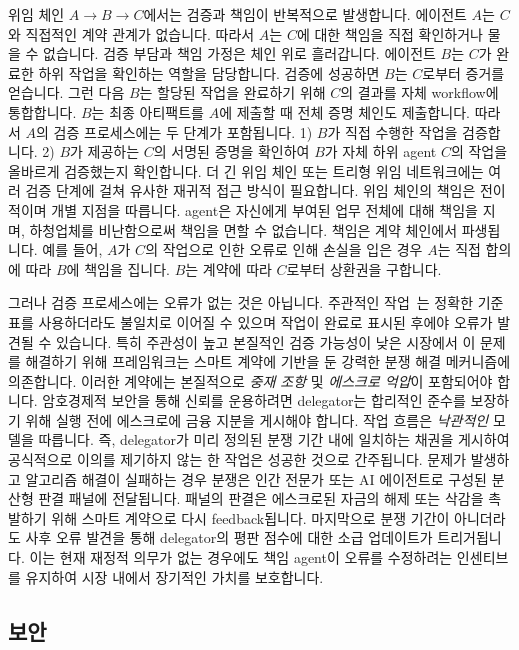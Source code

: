 \documentclass[11pt, a4paper, twocolumn, copyright, goog]{google}
\begin{document}
위임 체인 $A \rightarrow B \rightarrow C$에서는 검증과 책임이 반복적으로 발생합니다. 에이전트 $A$는 $C$와 직접적인 계약 관계가 없습니다. 따라서 $A$는 $C$에 대한 책임을 직접 확인하거나 물을 수 없습니다. 검증 부담과 책임 가정은 체인 위로 흘러갑니다. 에이전트 $B$는 $C$가 완료한 하위 작업을 확인하는 역할을 담당합니다. 검증에 성공하면 $B$는 $C$로부터 증거를 얻습니다. 그런 다음 $B$는 할당된 작업을 완료하기 위해 $C$의 결과를 자체 workflow에 통합합니다. $B$는 최종 아티팩트를 $A$에 제출할 때 전체 증명 체인도 제출합니다. 따라서 $A$의 검증 프로세스에는 두 단계가 포함됩니다. 1) $B$가 직접 수행한 작업을 검증합니다. 2) $B$가 제공하는 $C$의 서명된 증명을 확인하여 $B$가 자체 하위 agent $C$의 작업을 올바르게 검증했는지 확인합니다. 더 긴 위임 체인 또는 트리형 위임 네트워크에는 여러 검증 단계에 걸쳐 유사한 재귀적 접근 방식이 필요합니다. 위임 체인의 책임은 전이적이며 개별 지점을 따릅니다. agent은 자신에게 부여된 업무 전체에 대해 책임을 지며, 하청업체를 비난함으로써 책임을 면할 수 없습니다. 책임은 계약 체인에서 파생됩니다. 예를 들어, $A$가 $C$의 작업으로 인한 오류로 인해 손실을 입은 경우 $A$는 직접 합의에 따라 $B$에 책임을 집니다. $B$는 계약에 따라 $C$로부터 상환권을 구합니다.

그러나 검증 프로세스에는 오류가 없는 것은 아닙니다. 주관적인 작업~\citep{gunjal2025rubrics}는 정확한 기준표를 사용하더라도 불일치로 이어질 수 있으며 작업이 완료로 표시된 후에야 오류가 발견될 수 있습니다. 특히 주관성이 높고 본질적인 검증 가능성이 낮은 시장에서 이 문제를 해결하기 위해 프레임워크는 스마트 계약에 기반을 둔 강력한 분쟁 해결 메커니즘에 의존합니다. 이러한 계약에는 본질적으로 \emph{중재 조항} 및 \emph{에스크로 억압}이 포함되어야 합니다. 암호경제적 보안을 통해 신뢰를 운용하려면 delegator는 합리적인 준수를 보장하기 위해 실행 전에 에스크로에 금융 지분을 게시해야 합니다. 작업 흐름은 \emph{낙관적인} 모델을 따릅니다. 즉, delegator가 미리 정의된 분쟁 기간 내에 일치하는 채권을 게시하여 공식적으로 이의를 제기하지 않는 한 작업은 성공한 것으로 간주됩니다. 문제가 발생하고 알고리즘 해결이 실패하는 경우 분쟁은 인간 전문가 또는 AI 에이전트로 구성된 분산형 판결 패널에 전달됩니다. 패널의 판결은 에스크로된 자금의 해제 또는 삭감을 촉발하기 위해 스마트 계약으로 다시 feedback됩니다. 마지막으로 분쟁 기간이 아니더라도 사후 오류 발견을 통해 delegator의 평판 점수에 대한 소급 업데이트가 트리거됩니다. 이는 현재 재정적 의무가 없는 경우에도 책임 agent이 오류를 수정하려는 인센티브를 유지하여 시장 내에서 장기적인 가치를 보호합니다.

\subsection{보안}
\label{sec:security}
\end{document}
